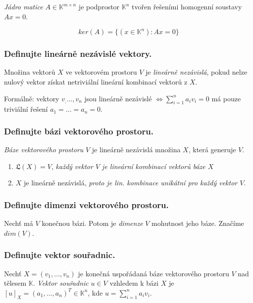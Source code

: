\documentclass[10pt,a4paper]{article}
\begin{document}
\textit{Jádro matice} $A \in \mathbb{K}^{m \times n}$ je podprostor $\mathbb{K}^n$ tvořen řešeními homogenní soustavy $Ax = 0$.

\begin{equation*}
ker(A) = \{(x \in \mathbb{K}^n) : Ax = 0 \}
\end{equation*}

\subsubsection{Definujte lineárně nezávislé vektory.}

Množina vektorů $X$ ve vektorovém prostoru $V$ je \textit{lineárně nezávislá}, pokud nelze nulový vektor získat netriviální lineární kombinací vektorů z $X$.

Formálně: vektory $v_, ... , v_n$ jsou lineárně nezávislé $\iff \displaystyle \sum_{i=1}^n a_iv_i = 0$ má pouze triviální řešení $a_1 = ... = a_n = 0$.

\subsubsection{Definujte bázi vektorového prostoru.}

\textit{Báze vektorového prostoru} $V$ je lineárně nezávislá množina $X$, která generuje $V$.

\begin{enumerate}
    \item $\mathfrak{L}(X) = V$, \textit{každý vektor $V$ je lineární kombinací vektorů báze $X$}
\item $X$ je lineárně nezávislá, \textit{proto je lin. kombinace unikátní pro každý vektor $V$}.
\end{enumerate}

\subsubsection{Definujte dimenzi vektorového prostoru.}

Nechť má $V$ konečnou bázi. Potom je \textit{dimenze} $V$ mohutnost jeho báze. Značíme $dim(V)$.

\subsubsection{Definujte vektor souřadnic.}

Nechť $X = (v_1, ..., v_n)$ je konečná uspořádaná báze vektorového prostoru $V$ nad tělesem $\mathbb{K}$.
\textit{Vektor souřadnic} $u \in V$ vzhledem k bázi $X$ je $[u]_X = (a_1, ..., a_n)^T \in \mathbb{K}^n$, kde $\displaystyle u = \sum_{i=1}^n a_i v_i$.
\end{document}
